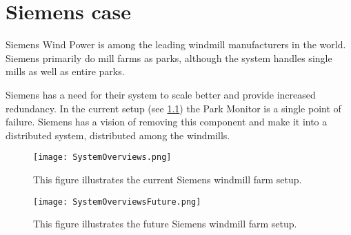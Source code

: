 \chapter{Siemens case}

Siemens Wind Power is among the leading windmill manufacturers in the world.
Siemens primarily do mill farms as parks, although the system handles single mills as well as entire parks.

Siemens has a need for their system to scale better and provide increased redundancy.
In the current setup (see \cref{fig:currentSiemensSetup}) the Park Monitor is a single point of failure.
Siemens has a vision of removing this component and make it into a distributed system, distributed among the windmills.

\begin{figure}
	\centering
	\texttt{[image: SystemOverviews.png]} 
	\caption[Illustrates the current Siemens windmill farm setup]{
		\label{fig:currentSiemensSetup} 
		\footnotesize{%
			This figure illustrates the current Siemens windmill farm setup.
		}
	}
\end{figure}

\begin{figure}
	\centering
	\texttt{[image: SystemOverviewsFuture.png]} 
	\caption[Illustrates the future Siemens windmill farm setup]{
		\label{fig:futureSiemensSetup} 
		\footnotesize{%
			This figure illustrates the future Siemens windmill farm setup.
		}
	}
\end{figure}
